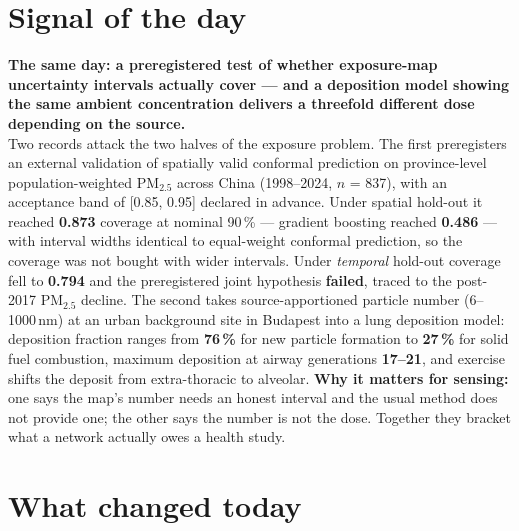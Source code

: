 \documentclass[10pt]{article}
\begin{document}
\vspace{6mm}

\section*{\sffamily\bfseries\color{Deep}Signal of the day}
\vspace{-1.5mm}{\color{Amber}\rule{\linewidth}{1.1pt}}\vspace{2.5mm}

\begin{keybox}
{\sffamily\bfseries\small\color{Deep}The same day: a preregistered test of whether exposure-map
uncertainty intervals actually cover --- and a deposition model showing the same ambient concentration
delivers a threefold different dose depending on the source.}\\[1.4mm]
\footnotesize
Two records attack the two halves of the exposure problem. The first preregisters an external validation
of spatially valid conformal prediction on province-level population-weighted PM$_{2.5}$ across China
(1998--2024, $n$ = 837), with an acceptance band of [0.85, 0.95] declared in advance. Under spatial
hold-out it reached \textbf{0.873} coverage at nominal 90\,\% --- gradient boosting reached \textbf{0.486}
--- with interval widths identical to equal-weight conformal prediction, so the coverage was not bought
with wider intervals. Under \textit{temporal} hold-out coverage fell to \textbf{0.794} and the
preregistered joint hypothesis \textbf{failed}, traced to the post-2017 PM$_{2.5}$ decline.
The second takes source-apportioned particle number (6--1000\,nm) at an urban background site in Budapest
into a lung deposition model: deposition fraction ranges from \textbf{76\,\%} for new particle formation to
\textbf{27\,\%} for solid fuel combustion, maximum deposition at airway generations \textbf{17--21}, and
exercise shifts the deposit from extra-thoracic to alveolar.
\textbf{Why it matters for sensing:} one says the map's number needs an honest interval and the usual
method does not provide one; the other says the number is not the dose. Together they bracket what a
network actually owes a health study.\par
\end{keybox}

\vspace{3mm}

\section*{\sffamily\bfseries\color{Deep}What changed today}
\vspace{-1.5mm}{\color{Amber}\rule{\linewidth}{1.1pt}}\vspace{2.5mm}
\end{document}

